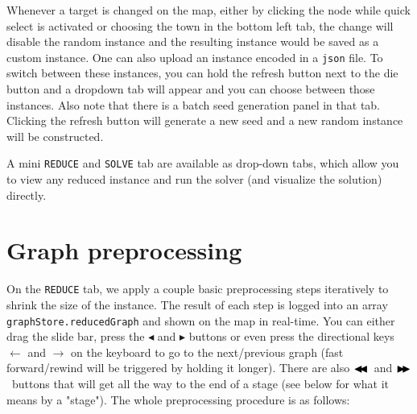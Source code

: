 \documentclass[11pt]{article}
\newcommand{\ffwdcompact}{\ensuremath{\blacktriangleright\mkern-5.5mu\blacktriangleright}}
\newcommand{\rwndcompact}{\ensuremath{\blacktriangleleft\mkern-5.5mu\blacktriangleleft}}
\theoremstyle{definition}
\theoremstyle{remark}
\begin{document}
Whenever a target is changed on the map, either by clicking the node while quick select is activated or choosing the town in the bottom left tab, the change will disable the random instance and the resulting instance would be saved as a custom instance. One can also upload an instance encoded in a \texttt{json} file. To switch between these instances, you can hold the refresh button next to the die button and a dropdown tab will appear and you can choose between those instances. Also note that there is a batch seed generation panel in that tab. Clicking the refresh button will generate a new seed and a new random instance will be constructed.

A mini \texttt{REDUCE} and \texttt{SOLVE} tab are available as drop-down tabs, which allow you to view any reduced instance and run the solver (and visualize the solution) directly.


\section{Graph preprocessing}
\label{reduce}
On the \texttt{REDUCE} tab, we apply a couple basic preprocessing steps iteratively to shrink the size of the instance. The result of each step is logged into an array \texttt{graphStore.reducedGraph} and shown on the map in real-time. You can either drag the slide bar, press the $\blacktriangleleft$ and $\blacktriangleright$ buttons or even press the directional keys $\leftarrow$ and $\rightarrow$ on the keyboard to go to the next/previous graph (fast forward/rewind will be triggered by holding it longer). There are also \rwndcompact \ and \ffwdcompact \ buttons that will get all the way to the end of a stage (see below for what it means by a "stage"). The whole preprocessing procedure is as follows:
\end{document}
